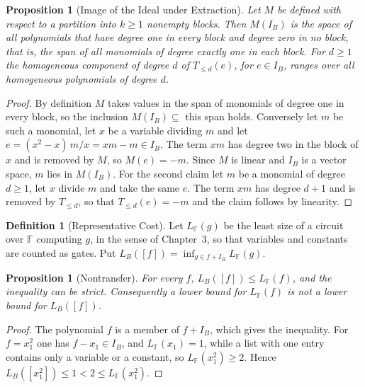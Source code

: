 \documentclass[11pt,letterpaper]{report}
\theoremstyle{plain}
\newtheorem{proposition}[theorem]{Proposition}
\theoremstyle{definition}
\newtheorem{definition}[theorem]{Definition}
\theoremstyle{remark}
\begin{document}
\begin{proposition}[Image of the Ideal under Extraction]\label{pr:imageideal}
Let $M$ be defined with respect to a partition into $k\ge1$ nonempty blocks. Then $M(I_B)$ is the space of all polynomials that have degree one in every block and degree zero in no block, that is, the span of all monomials of degree exactly one in each block. For $d\ge1$ the homogeneous component of degree $d$ of $T_{\le d}(e)$, for $e\in I_B$, ranges over all homogeneous polynomials of degree $d$.
\end{proposition}
\begin{proof}
By definition $M$ takes values in the span of monomials of degree one in every block, so the inclusion $M(I_B)\subseteq$ this span holds. Conversely let $m$ be such a monomial, let $x$ be a variable dividing $m$ and let $e=(x^2-x)\,m/x=xm-m\in I_B$. The term $xm$ has degree two in the block of $x$ and is removed by $M$, so $M(e)=-m$. Since $M$ is linear and $I_B$ is a vector space, $m$ lies in $M(I_B)$. For the second claim let $m$ be a monomial of degree $d\ge1$, let $x$ divide $m$ and take the same $e$. The term $xm$ has degree $d+1$ and is removed by $T_{\le d}$, so that $T_{\le d}(e)=-m$ and the claim follows by linearity.
\end{proof}

\begin{definition}[Representative Cost]
Let $L_{\mathbb F}(g)$ be the least size of a circuit over $\mathbb F$ computing $g$, in the sense of Chapter~3, so that variables and constants are counted as gates. Put $L_B([f])=\inf_{g\in f+I_B}L_{\mathbb F}(g)$.
\end{definition}

\begin{proposition}[Nontransfer]\label{pr:nontransfer}
For every $f$, $L_B([f])\le L_{\mathbb F}(f)$, and the inequality can be strict. Consequently a lower bound for $L_{\mathbb F}(f)$ is not a lower bound for $L_B([f])$.
\end{proposition}
\begin{proof}
The polynomial $f$ is a member of $f+I_B$, which gives the inequality. For $f=x_1^2$ one has $f-x_1\in I_B$, and $L_{\mathbb F}(x_1)=1$, while a list with one entry contains only a variable or a constant, so $L_{\mathbb F}(x_1^2)\ge2$. Hence $L_B([x_1^2])\le1<2\le L_{\mathbb F}(x_1^2)$.
\end{proof}
\end{document}
